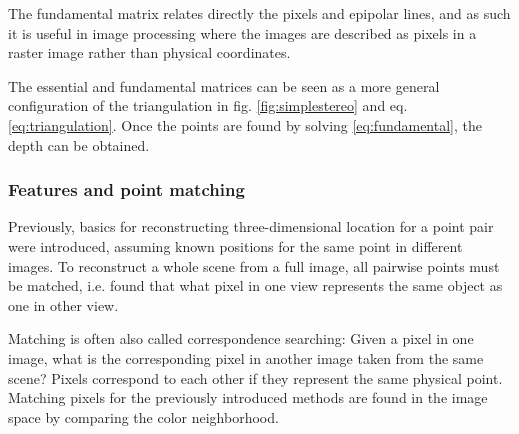 The fundamental matrix relates directly the pixels and epipolar lines, and as such it is useful in image processing where the images are described as pixels in a raster image rather than physical coordinates.


%


The essential and fundamental matrices can be seen as a more general configuration of the triangulation in fig. \ref{fig:simplestereo} and eq. \ref{eq:triangulation}.
Once the points are found by solving \ref{eq:fundamental}, the depth can be obtained.



\subsubsection{Features and point matching} %


Previously, basics for reconstructing three-dimensional location for a point pair were introduced, assuming known positions for the same point in different images.
To reconstruct a whole scene from a full image, all pairwise points must be matched, i.e. found that what pixel in one view represents the same object as one in other view.

Matching is often also called correspondence searching:
Given a pixel in one image, what is the corresponding pixel in another image taken from the same scene?
Pixels correspond to each other if they represent the same physical point.
Matching pixels for the previously introduced methods are found in the image space by comparing the color neighborhood.

